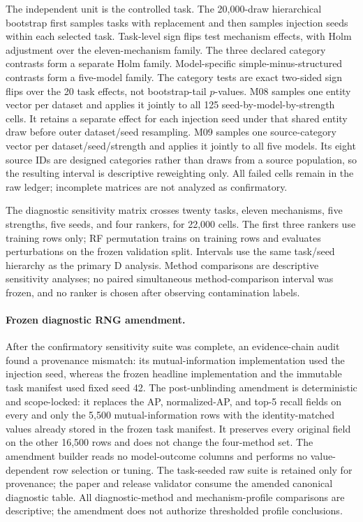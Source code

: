 \documentclass[letterpaper]{article}
\begin{document}
The independent unit is the controlled task.  The 20,000-draw hierarchical
bootstrap first samples tasks with replacement and then samples injection seeds
within each selected task.  Task-level sign flips test mechanism effects, with
Holm adjustment over the eleven-mechanism family.  The three declared category
contrasts form a separate Holm family.  Model-specific simple-minus-structured
contrasts form a five-model family.  The category tests are exact two-sided
sign flips over the 20 task effects, not bootstrap-tail $p$-values.  M08 samples
one entity vector per dataset and applies it jointly to all 125
seed-by-model-by-strength cells.  It retains a separate effect for each
injection seed under that shared entity draw before outer dataset/seed
resampling.  M09 samples one
source-category vector per dataset/seed/strength and applies it jointly to all
five models.  Its eight source IDs are designed categories rather than draws
from a source population, so the resulting interval is descriptive reweighting
only.  All failed cells remain in the raw ledger; incomplete matrices are not
analyzed as confirmatory.

The diagnostic sensitivity matrix crosses twenty tasks, eleven mechanisms,
five strengths, five seeds, and four rankers, for 22,000 cells.  The first
three rankers use training rows only; RF permutation trains on training rows
and evaluates perturbations on the frozen validation split.  Intervals use the
same task/seed hierarchy as the primary D analysis.  Method comparisons are
descriptive sensitivity analyses; no paired simultaneous method-comparison
interval was frozen, and no ranker is chosen after observing contamination
labels.

\paragraph{Frozen diagnostic RNG amendment.}
After the confirmatory sensitivity suite was complete, an evidence-chain audit
found a provenance mismatch: its mutual-information implementation used the
injection seed, whereas the frozen headline implementation and the
immutable task manifest used fixed seed 42.  The post-unblinding amendment is
deterministic and scope-locked: it replaces the AP, normalized-AP, and top-5
recall fields on every and only the 5,500 mutual-information rows with the
identity-matched values already stored in the frozen task manifest.  It
preserves every original field on the other 16,500 rows and does not change
the four-method set.  The amendment builder reads no
model-outcome columns and performs no value-dependent row selection or tuning.
The task-seeded raw suite is retained only for provenance; the paper and
release validator consume the amended canonical diagnostic table.  All
diagnostic-method and mechanism-profile comparisons are descriptive; the
amendment does not authorize thresholded profile conclusions.
\end{document}
